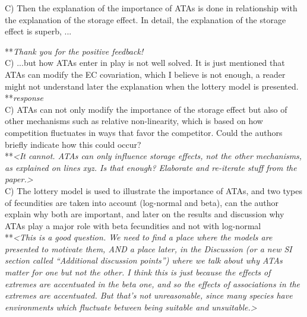 \documentclass[letterpaper,11pt]{article}
\begin{document}
\noindent C) Then the explanation of the importance of ATAs is done in relationship with the explanation of the storage effect. In detail, the explanation of the storage effect is superb, ...

\noindent ***\emph{Thank you for the positive feedback!} \\

\noindent C) ...but how ATAs enter in play is not well solved. It is just mentioned that ATAs can modify the EC covariation, which I believe is not enough, a reader might not understand later the explanation when the lottery model is presented. \\

\noindent ***\emph{response} \\

\noindent C) ATAs can not only modify the importance of the storage effect but also of other mechanisms such as relative non-linearity, which is based on how competition fluctuates in ways that favor the competitor. Could the authors briefly indicate how this could occur? \\

\noindent ***\emph{<It cannot. ATAs can only influence storage effects, not the other mechanisms, as explained on 
lines xyz. Is that enough? Elaborate and re-iterate stuff from the paper.>} \\

\noindent C) The lottery model is used to illustrate the importance of ATAs, and two types of fecundities are taken into account (log-normal and beta), can the author explain why both are important, and later on the results and discussion why ATAs play a major role with beta fecundities and not with log-normal \\

\noindent ***\emph{<This is a good question. We need to find a place where the models are presented to motivate
them, AND a place later, in the Discussion (or a new SI section called ``Additional discussion points'') where
we talk about why ATAs matter for one but not the other. I think this is just because the
effects of extremes are accentuated in the beta one, and so the effects of associations in the extremes are
accentuated. But that's not unreasonable, since many species have environments which fluctuate between
being suitable and unsuitable.>} \\
\end{document}
